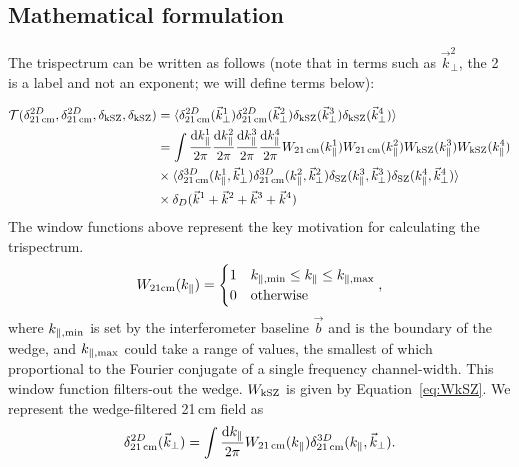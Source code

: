 \subsection{Mathematical formulation}

The trispectrum can be written as follows (note that in terms such as $\vec{k}^2_{\perp}$, the 2 is a label and not an exponent; we will define terms below):

\begin{equation}
\begin{split}
\mathcal{T}(\delta^{2D}_{\rm 21\,cm}, \delta^{2D}_{\rm 21\,cm}, \delta_{\rm kSZ}, \delta_{\rm kSZ}) &=
\langle \delta^{2D}_{\rm 21\,cm}(\vec{k}^1_{\perp})  \delta^{2D}_{\rm 21\,cm}(\vec{k}^2_{\perp})  \delta_{\rm kSZ}(\vec{k}^3_{\perp})\delta_{\rm kSZ}(\vec{k}^4_{\perp}) \rangle \\
&=
\int \frac{{\rm d}k^1_{\parallel}}{2\pi} \frac{{\rm d}k^2_{\parallel}}{2\pi} \frac{{\rm d}k^3_{\parallel}}{2\pi} \frac{{\rm d}k^4_{\parallel}}{2\pi}
W_{\rm 21\,cm}(k^1_{\parallel}) W_{\rm 21\,cm}(k^2_{\parallel}) W_{\rm kSZ}(k^3_{\parallel}) W_{\rm kSZ}(k^4_{\parallel}) \\
&
\times \langle \delta^{3D}_{\rm 21\,cm}(k^1_{\parallel}, \vec{k}^1_{\perp}) \delta^{3D}_{\rm 21\,cm}(k^2_{\parallel}, \vec{k}^2_{\perp}) \delta_{\rm SZ}(k^3_{\parallel}, \vec{k}^3_{\perp})  \delta_{\rm SZ}(k^4_{\parallel}, \vec{k}^4_{\perp}) \rangle \\
&
\times \delta_D(\vec{k}^1 + \vec{k}^2 + \vec{k}^3 + \vec{k}^4)
\end{split}
\label{eq:overall_trispec}
\end{equation}
The window functions above represent the key motivation for calculating the trispectrum.
\begin{equation}
W_{\rm 21cm}(k_{\parallel}) = 
\begin{cases} 
      1 & k_{\parallel, {\rm min}}\leq k_{\parallel} \leq k_{\parallel, {\rm max}} \\
      0 & {\rm otherwise}
\end{cases},
\label{eq:trispec_W21_kpl}
\end{equation}
where $k_{\parallel, {\rm min}}$ is set by the interferometer baseline $\vec{b}$ and is the boundary of the wedge, and $k_{\parallel, {\rm max}}$ could take a range of values, the smallest of which proportional to the Fourier conjugate of a single frequency channel-width. This window function filters-out the wedge. $W_{\rm kSZ}$ is given by Equation~\ref{eq:WkSZ}. We represent the wedge-filtered 21\,cm field as
\begin{equation}
\delta^{2D}_{\rm 21\,cm}(\vec{k}_{\perp}) = \int \frac{{\rm d}k_{\parallel}}{2\pi} W_{\rm 21\,cm}(k_{\parallel}) \delta^{3D}_{\rm 21\,cm}(k_{\parallel}, \vec{k}_{\perp}).
\end{equation}

